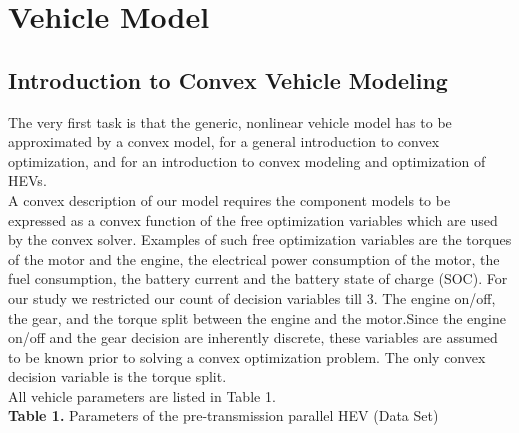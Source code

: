 \documentclass[conference]{IEEEtran}
\begin{document}
\section{\textbf{Vehicle Model}}

\subsection{Introduction to Convex Vehicle Modeling}
The very first task is that the generic, nonlinear vehicle model
has to be approximated by a convex model, for a general introduction to convex optimization, and for an introduction to convex modeling and optimization of HEVs.\\
A convex description of our model requires the component models to be expressed as a convex function of the free optimization variables which are used by the convex solver. Examples of such free optimization variables are the torques of the motor and the engine, the electrical power consumption of the motor, the fuel consumption, the battery current and the battery state of charge (SOC).
For our study we restricted our count of decision variables till 3. The engine on/off, the gear, and the torque split between the engine and the motor.Since the engine on/off and the gear decision are inherently discrete, these variables are assumed to be known prior to solving a convex optimization problem. The only convex decision variable is the torque split.\\
All vehicle parameters are listed in Table 1.\\
\textbf{Table 1.} Parameters of the pre-transmission parallel HEV (Data Set)
\end{document}

